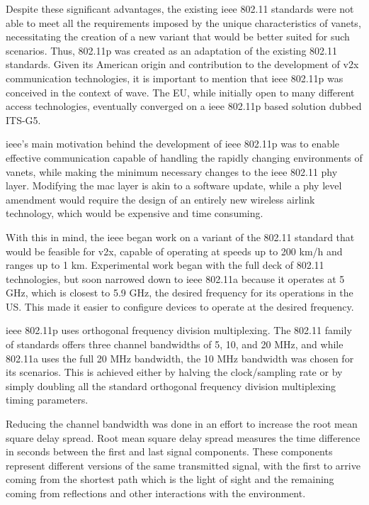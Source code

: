 Despite these significant advantages, the existing \gls{ieee} 802.11 standards were not able to meet all the requirements imposed by the unique characteristics of \glspl{vanet}, necessitating the creation of a new variant that would be better suited for such scenarios. Thus, 802.11p was created as an adaptation of the existing 802.11 standards. Given its American origin and contribution to the development of \gls{v2x} communication technologies, it is important to mention that \gls{ieee} 802.11p was conceived in the context of \gls{wave}\cite{jiang_ieee_2008}. The EU, while initially open to many different access technologies, eventually converged on a \gls{ieee} 802.11p based solution dubbed ITS-G5.

\gls{ieee}'s main motivation behind the development of \gls{ieee} 802.11p was to enable effective communication capable of handling the rapidly changing environments of \glspl{vanet}\cite{jiang_ieee_2008}, while making the minimum necessary changes to the \gls{ieee} 802.11 \gls{phy} layer. Modifying the \gls{mac} layer is akin to a software update, while a \gls{phy} level amendment would require the design of an entirely new wireless airlink technology\cite{jiang_ieee_2008}, which would be expensive and time consuming. 

With this in mind, the \gls{ieee} began work on a variant of the 802.11 standard that would be feasible for \gls{v2x}, capable of operating at speeds up to 200 km/h and ranges up to 1 km\cite{jakubiak_state_2008}. Experimental work began with the full deck of 802.11 technologies\cite{toor_vehicle_2008}, but soon narrowed down to \gls{ieee} 802.11a because it operates at 5 GHz, which is closest to 5.9 GHz, the desired frequency for \gls{its} operations in the US. This made it easier to configure devices to operate at the desired frequency\cite{jiang_ieee_2008}.


\gls{ieee} 802.11p uses orthogonal frequency division multiplexing. The 802.11 family of standards offers three channel bandwidths of 5, 10, and 20 MHz, and while 802.11a uses the full 20 MHz bandwidth, the 10 MHz bandwidth was chosen for \gls{its} scenarios. This is achieved either by halving the clock/sampling rate or by simply doubling all the standard orthogonal frequency division multiplexing timing parameters\cite{rohde__schwarz_intelligent_2019}.

Reducing the channel bandwidth was done in an effort to increase the root mean square delay spread\cite{toor_vehicle_2008}. Root mean square delay spread measures the time difference in seconds between the first and last signal components. These components represent different versions of the same transmitted signal, with the first to arrive coming from the shortest path which is the light of sight and the remaining coming from reflections and other interactions with the environment.


